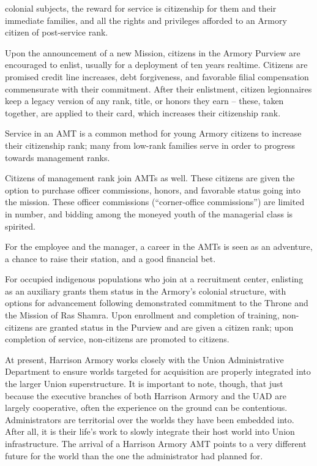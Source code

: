                                                                                                           


colonial subjects, the reward for service is citizenship for them and their immediate families, and  
all the rights and privileges afforded to an Armory citizen of post-service rank. 
 

Upon the announcement of a new Mission, citizens in the Armory Purview are encouraged to  
enlist, usually for a deployment of ten years realtime. Citizens are promised credit line increases,  
debt forgiveness, and favorable filial compensation commensurate with their commitment. After  
their enlistment, citizen legionnaires keep a legacy version of any rank, title, or honors they earn  
-- these, taken together, are applied to their card, which increases their citizenship rank. 
 

Service in an AMT is a common method for young Armory citizens to increase their citizenship  
rank; many from low-rank families serve in order to progress towards management ranks. 
 

Citizens of management rank join AMTs as well. These citizens are given the option to purchase  
officer commissions, honors, and favorable status going into the mission. These officer  
commissions (“corner-office commissions”) are limited in number, and bidding among the  
moneyed youth of the managerial class is spirited. 
 

For the employee and the manager, a career in the AMTs is seen as an adventure, a chance to  
raise their station, and a good financial bet. 
 

For occupied indigenous populations who join at a recruitment center, enlisting as an auxiliary  
grants them status in the Armory’s colonial structure, with options for advancement following  
demonstrated commitment to the Throne and the Mission of Ras Shamra. Upon enrollment and  
completion of training, non-citizens are granted status in the Purview and are given a citizen  
rank; upon completion of service, non-citizens are promoted to citizens.      

At present, Harrison Armory works closely with the Union Administrative Department to ensure  
worlds targeted for acquisition are properly integrated into the larger Union superstructure. It is  
important to note, though, that just because the executive branches of both Harrison Armory and  
the UAD are largely cooperative, often the experience on the ground can be contentious.  
Administrators are territorial over the worlds they have been embedded into. After all, it is their  
life’s work to slowly integrate their host world into Union infrastructure. The arrival of a Harrison  
Armory AMT points to a very different future for the world than the one the administrator had  
planned for.   
 

